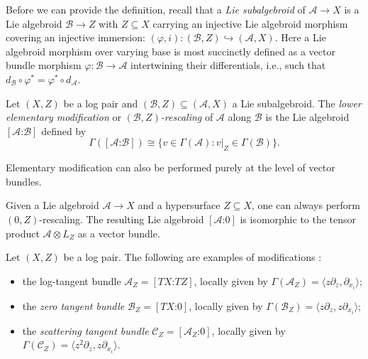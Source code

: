 \documentclass[pdftex]{sigma}
\numberwithin{equation}{section}
\begin{document}
Before we can provide the definition, recall that a \emph{Lie subalgebroid} of $\mathcal{A} \to X$ is a Lie algebroid $\mathcal{B} \to Z$ with $Z \subseteq X$ carrying an injective Lie algebroid morphism covering an injective immersion: $(\varphi,i)\colon (\mathcal{B},Z) \hookrightarrow (\mathcal{A},X)$. Here a Lie algebroid morphism over varying base is most succinctly defined as a vector bundle morphism $\varphi\colon \mathcal{B} \to \mathcal{A}$ intertwining their differentials, i.e., such that $d_\mathcal{B} \circ \varphi^* = \varphi^* \circ d_\mathcal{A}$.

\begin{Definition} Let $(X,Z)$ be a log pair and $(\mathcal{B},Z) \subseteq (\mathcal{A},X)$ a Lie subalgebroid. The \emph{lower elementary modification} or \emph{$(\mathcal{B},Z)$-rescaling} of $\mathcal{A}$ along $\mathcal{B}$ is the Lie algebroid $[\mathcal{A}\text{:}\mathcal{B}]$ defined by
	\begin{displaymath}
	\Gamma([\mathcal{A}\text{:}\mathcal{B}]) \cong \{v \in \Gamma(\mathcal{A}) \colon v|_Z \in \Gamma(\mathcal{B})\}.
	\end{displaymath}
\end{Definition}

Elementary modification can also be performed purely at the level of vector bundles.

\begin{Remark}\label{rem:zerorescaling} Given a Lie algebroid $\mathcal{A} \to X$ and a hypersurface $Z \subseteq X$, one can always perform $(0,Z)$-rescaling. The resulting Lie algebroid $[\mathcal{A}\text{:}0]$ is isomorphic to the tensor product $\mathcal{A} \otimes L_Z$ as a vector bundle.
\end{Remark}

\begin{Example} Let $(X,Z)$ be a log pair. The following are examples of modifications \cite{Melrose93,Melrose95}:
	\begin{itemize}\itemsep=0pt
	\item the log-tangent bundle $\mathcal{A}_Z = [TX\text{:}TZ]$, locally given by $\Gamma(\mathcal{A}_Z) = \langle z \partial_z, \partial_{x_i} \rangle$;
	\item the \emph{zero tangent bundle} $\mathcal{B}_Z = [TX\text{:}0]$, locally given by $\Gamma(\mathcal{B}_Z) = \langle z \partial_z, z \partial_{x_i} \rangle$;
	\item the \emph{scattering tangent bundle} $\mathcal{C}_Z = [\mathcal{A}_Z\text{:}0]$, locally given by $\Gamma(\mathcal{C}_Z) = \langle z^2 \partial_z, z \partial_{x_i} \rangle$.
	\end{itemize}
\end{Example}
\end{document}
